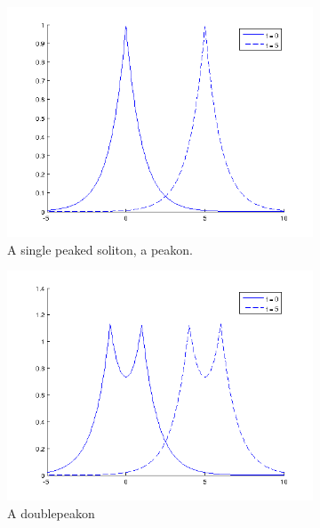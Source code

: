 \begin{figure}[h!]
        \centering
        \begin{subfigure}[b]{0.49\textwidth}
                \includegraphics[width=\textwidth]{gfx/peakon}
                \caption{A single peaked soliton, a peakon.}
                \label{fig:peakon}
        \end{subfigure}
        \begin{subfigure}[b]{0.49\textwidth}
                \includegraphics[width=\textwidth]{gfx/doublepeakon}
                \caption{A doublepeakon}
                \label{fig:doublepeakon}
        \end{subfigure}
        \begin{subfigure}[b]{0.49\textwidth}

\end{subfigure}
\end{figure}
